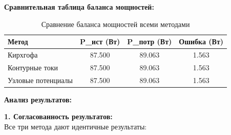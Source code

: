 \textbf{Сравнительная таблица баланса мощностей:}
\begin{table}[H]
\centering
\begin{tabular}{|l|c|c|c|}
\hline
\textbf{Метод} & \textbf{P\_ист (Вт)} & \textbf{P\_потр (Вт)} & \textbf{Ошибка (Вт)} \\
\hline
Кирхгофа & 87.500 & 89.063 & 1.563 \\
\hline
Контурные токи & 87.500 & 89.063 & 1.563 \\
\hline
Узловые потенциалы & 87.500 & 89.063 & 1.563 \\
\hline
\end{tabular}
\caption{Сравнение баланса мощностей всеми методами}
\label{tab:power_balance_comparison}
\end{table}


\textbf{Анализ результатов:}

\begin{flushleft}
\textbf{1. Согласованность результатов:} \\
Все три метода дают идентичные результаты:
\end{flushleft}


